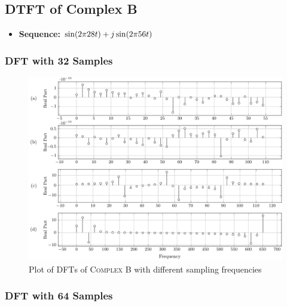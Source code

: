 \documentclass[../../course]{subfiles}
\begin{document}
\pagebreak

\subsection{DTFT of Complex B} \label{ssec:dtftCplxB}

\begin{itemize} [label=]

    \item \textbf{Sequence:} $\sin(2 \pi 28 t) + j \sin(2 \pi 56 t)$

\end{itemize}

\subsubsection{DFT with 32 Samples}

\vfill

\begin{figure} [H]
    \centering
     {
        \includegraphics[height = 0.8\textheight] {tikzpics/plotDftComplexB32.pdf}
    }
     {Plot of \textsc{DFT}s of \textsc{Complex B} with different sampling frequencies}
    \label{plt:dftComplexB}
\end{figure}

\subsubsection{DFT with 64 Samples}

\vfill
\end{document}
